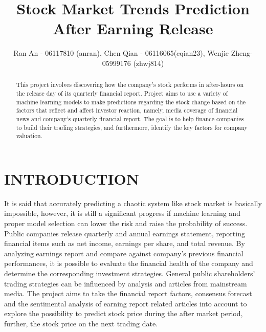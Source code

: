 \documentclass[letterpaper, 10 pt, conference]{ieeeconf}  %
\begin{document}
\title{\LARGE \bf
Stock Market Trends Prediction After Earning Release
}

\author
{Ran An - 06117810 (anran), 
Chen Qian - 06116065(cqian23), 
Wenjie Zheng- 05999176 (zhwj814)}

\maketitle
\thispagestyle{empty}
\pagestyle{empty}


\begin{abstract}

This project involves discovering how the company's stock performs in after-hours on the release day of its quarterly financial report. Project aims to use a variety of machine learning models to make predictions regarding the stock change based on the factors that reflect and affect investor reaction, namely, media coverage of financial news and company’s quarterly financial report. The goal is to help finance companies to build their trading strategies, and furthermore, identify the key factors for company valuation. 


\end{abstract}



\section{INTRODUCTION}

It is said that accurately predicting a chaotic system like stock market is basically impossible, however, it is still a significant progress if machine learning and proper model selection can lower the risk and raise the probability of success. Public companies release quarterly and annual earnings statement, reporting financial items such as net income, earnings per share, and total revenue. By analyzing earnings report and compare against company's previous financial performances, it is possible to evaluate the financial health of the company and determine the corresponding investment strategies. General public shareholders' trading strategies can be influenced by analysis and articles from mainstream media. The project aims to take the financial report factors, consensus forecast and the sentimental analysis of earning report related articles into account to explore the possibility to predict stock price during the after market period, further, the stock price on the next trading date.
\end{document}
